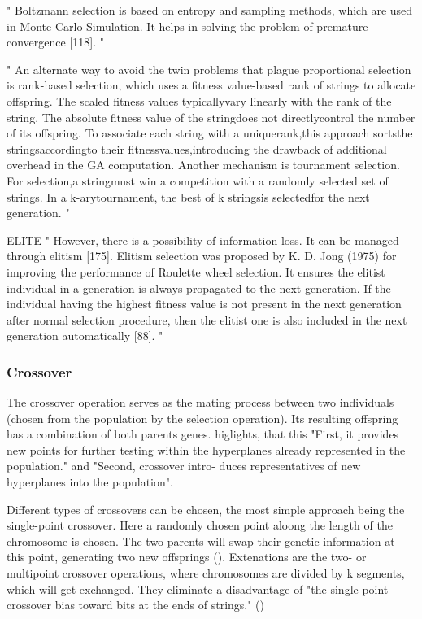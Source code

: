 "
Boltzmann selection is based on entropy and sampling methods, which are used in Monte Carlo Simulation. It helps in solving the problem of premature convergence [118].
"\cite{katoch_review_2021}


"
An alternate way to avoid the twin problems that plague proportional selection is rank-based selection, which uses a fitness value-based rank of strings to allocate offspring. The scaled fitness values typicallyvary linearly with the rank of the string. The absolute fitness value of the stringdoes not directlycontrol the number of its offspring. To associate each string with a uniquerank,this approach sortsthe stringsaccordingto their fitnessvalues,introducing the drawback of additional overhead in the GA computation. Another mechanism is tournament selection. For selection,a stringmust win a competition with a randomly selected set of strings. In a k-arytournament, the best of k stringsis selectedfor the next generation.
"\cite{srinivas_genetic_1994}


ELITE
"
However, there is a possibility of information loss. It can be managed through elitism [175]. Elitism selection was proposed by K. D. Jong (1975) for improving the performance of Roulette wheel selection. It ensures the elitist individual in a generation is always propagated to the next generation. If the individual having the highest fitness value is not present in the next generation after normal selection procedure, then the elitist one is also included in the next generation automatically [88].
"\cite{katoch_review_2021}

\subsubsection{Crossover}
The crossover operation serves as the mating process between two individuals (chosen from the population by the selection operation). Its resulting offspring has a combination of both parents genes. \cite{grefenstette_optimization_1986} higlights, that this "First, it provides new points for further testing within the hyperplanes already represented in the population." and "Second, crossover intro- duces representatives of new hyperplanes into the population". 

Different types of crossovers can be chosen, the most simple approach being the single-point crossover. Here a randomly chosen point aloong the length of the chromosome is chosen. The two parents will swap their genetic information at this point, generating two new offsprings (\cite{katoch_review_2021}). Extenations are the two- or multipoint crossover operations, where chromosomes are divided by k segments, which will get exchanged. They eliminate a disadvantage of "the single-point crossover bias toward bits at the ends of strings." (\cite{srinivas_genetic_1994})

